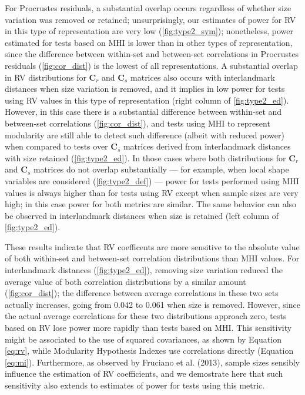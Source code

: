 \documentclass[12pt,twoside]{report}
\begin{document}
For Procrustes residuals, a substantial overlap occurs regardless of
whether size variation was removed or retained; unsurprisingly, our
estimates of power for RV in this type of representation are very low
(\autoref{fig:type2_sym}); nonetheless, power estimated for tests based
on MHI is lower than in other types of representation, since the
difference between within-set and between-set correlations in Procrustes
residuals (\autoref{fig:cor_dist}) is the lowest of all representations.
A substantial overlap in RV distributions for $\mathbf{C}_r$ and
$\mathbf{C}_s$ matrices also occurs with interlandmark distances when
size variation is removed, and it implies in low power for tests using
RV values in this type of representation (right column of
\autoref{fig:type2_ed}). However, in this case there is a substantial
difference between within-set and between-set correlations
(\autoref{fig:cor_dist}), and tests using MHI to represent modularity
are still able to detect such difference (albeit with reduced power)
when compared to tests over $\mathbf{C}_s$ matrices derived from
interlandmark distances with size retained (\autoref{fig:type2_ed}). In
those cases where both distributions for $\mathbf{C}_r$ and
$\mathbf{C}_s$ matrices do not overlap substantially --- for example,
when local shape variables are considered (\autoref{fig:type2_def}) ---
power for tests performed using MHI values is always higher than for
tests using RV except when sample sizes are very high; in this case
power for both metrics are similar. The same behavior can also be
observed in interlandmark distances when size is retained (left column
of \autoref{fig:type2_ed}).

These results indicate that RV coefficents are more sensitive to the
absolute value of both within-set and between-set correlation
distributions than MHI values. For interlandmark distances
(\autoref{fig:type2_ed}), removing size variation reduced the average
value of both correlation distributions by a similar amount
(\autoref{fig:cor_dist}); the difference between average correlations in
these two sets actually increases, going from 0.042 to 0.061 when size
is removed. However, since the actual average correlations for these two
distributions approach zero, tests based on RV lose power more rapidly
than tests based on MHI. This sensitivity might be associated to the use
of squared covariances, as shown by Equation \ref{eq:rv}, while
Modularity Hypothesis Indexes use correlations directly (Equation
\ref{eq:mi}). Furthermore, as observed by Fruciano et al. (2013), sample
sizes sensibly influence the estimation of RV coefficients, and we
demostrate here that such sensitivity also extends to estimates of power
for tests using this metric.
\end{document}
